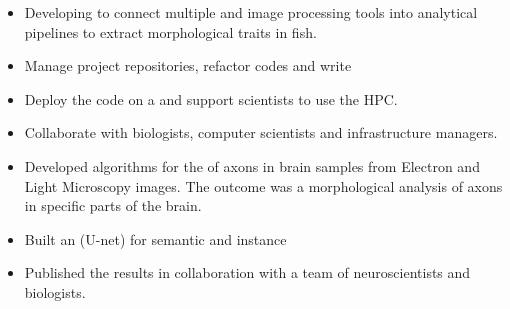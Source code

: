 \documentclass[10pt,a4paper,ragged2e,withhyper]{altacv}
\begin{document}
\begin{paracol}{2}
        \newpage
        
        
        \switchcolumn

        
            \begin{itemize}
                \item Developing  to connect multiple  and image processing tools into analytical pipelines to extract morphological traits in fish.
                \item Manage  project repositories, refactor codes and write 
                \item Deploy the code on a  and support scientists to use the HPC.
                \item Collaborate with biologists, computer scientists and infrastructure managers.
            \end{itemize}
            \divider
            
            \begin{itemize}
                \item Developed algorithms for the  of axons in brain samples from Electron and Light Microscopy images. The outcome was a morphological analysis of axons in specific parts of the brain.
                \item Built an  (U-net) for semantic and instance 
                \item Published the results in collaboration with a team of neuroscientists and biologists.
            \end{itemize}
            \divider            
            \begin{itemize}
            

\end{itemize}
\end{paracol}
\end{document}
